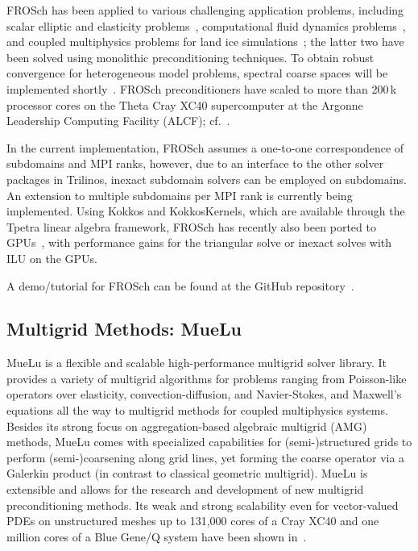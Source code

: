 FROSch has been applied to various challenging application problems, including scalar elliptic and elasticity problems~\cite{heinlein_parallel_2016}, computational fluid dynamics problems~\cite{heinlein_monolithic_2019}, and coupled multiphysics problems for land ice simulations~\cite{heinlein_frosch_2022}; the latter two have been solved using monolithic preconditioning techniques. To obtain robust convergence for heterogeneous model problems, spectral coarse spaces will be implemented shortly~\cite{heinlein_adaptive_2019}. FROSch preconditioners have scaled to more than 200\,k processor cores on the Theta Cray XC40 supercomputer at the Argonne Leadership Computing Facility (ALCF); cf.~\cite{heinlein_parallel_2022}.

In the current implementation, FROSch assumes a one-to-one correspondence of subdomains and MPI ranks, however, due to an interface to the other solver packages in Trilinos, inexact subdomain solvers can be employed on subdomains. An extension to multiple subdomains per MPI rank is currently being implemented. Using Kokkos and KokkosKernels, which are available through the Tpetra linear algebra framework, FROSch has recently also been ported to GPUs~\cite{Yamazaki:2022:EST}, with performance gains for the triangular solve or inexact solves with ILU on the GPUs.

A demo/tutorial for FROSch can be found at the GitHub repository~\cite{frosch_demo}.

\subsection{Multigrid Methods: MueLu}

MueLu is a flexible and scalable high-performance multigrid solver library.
It provides a variety of multigrid algorithms for problems ranging from Poisson-like operators over elasticity, convection-diffusion, and Navier-Stokes, and Maxwell’s equations
all the way to multigrid methods for coupled multiphysics systems.
Besides its strong focus on aggregation-based algebraic multigrid (AMG) methods,
MueLu comes with specialized capabilities for (semi-)structured grids to perform (semi-)coarsening along grid lines,
yet forming the coarse operator via a Galerkin product (in contrast to classical geometric multigrid).
MueLu is extensible and allows for the research and development of new multigrid preconditioning methods.
Its weak and strong scalability even for vector-valued PDEs on unstructured meshes
up to 131,000 cores of a Cray XC40 and one million cores of a Blue Gene/Q system have been shown in~\cite{Lin2017a,Thomas2019a}.

